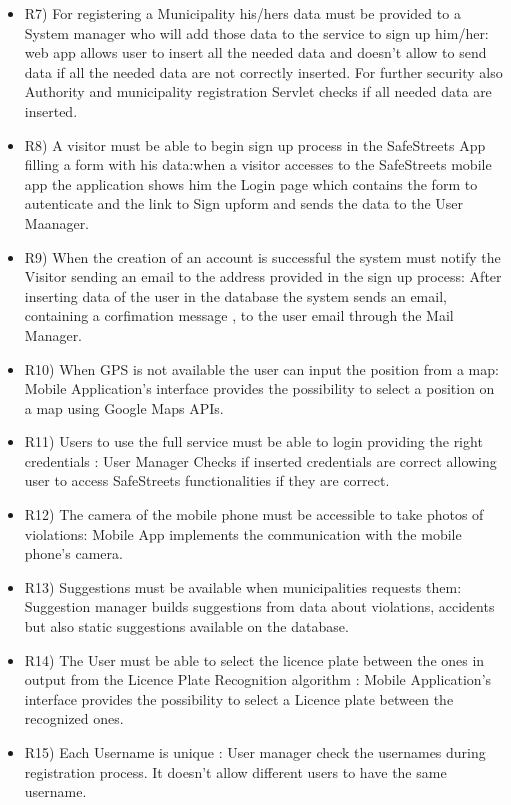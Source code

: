 \begin{itemize}
\item  R7) For registering a Municipality his/hers data must be provided to a System manager who will
add those data to the service to sign up him/her: web app allows user to insert all the needed data and doesn't allow to send data if all the needed data are not correctly inserted. For further security also Authority and municipality registration Servlet checks if all needed data are inserted.
\item  R8) A visitor must be able to begin sign up process in the SafeStreets App filling a form with his
data:when a visitor accesses to the SafeStreets mobile app the application shows him the Login page which contains the form to autenticate and the link to Sign upform and sends the data to the User Maanager.
\item  R9) When the creation of an account is successful the system must notify the Visitor sending an
email to the address provided in the sign up process: After inserting data of the user in the database the system sends an email, containing a corfimation message , to the user email through the Mail Manager.
\item  R10) When GPS is not available the user can input the position from a map: Mobile Application's interface provides the possibility to select a position on a map using Google Maps APIs.
\item  R11) Users to use the full service must be able to login providing the right credentials : User Manager Checks if inserted credentials are correct allowing user to access SafeStreets functionalities if they are correct.
\item  R12) The camera of the mobile phone must be accessible to take photos of violations: Mobile App implements the communication with the mobile phone's camera.
\item  R13) Suggestions must be available when municipalities requests them: Suggestion manager builds suggestions from data about violations, accidents but also static suggestions available on the database.
\item  R14) The User must be able to select the licence plate between the ones in output from the Licence
Plate Recognition algorithm :  Mobile Application's interface provides the possibility to select a Licence plate between the recognized ones.
\item  R15) Each Username is unique : User manager check the usernames during registration process. It doesn't allow different users to have the same username.
\end{itemize}

